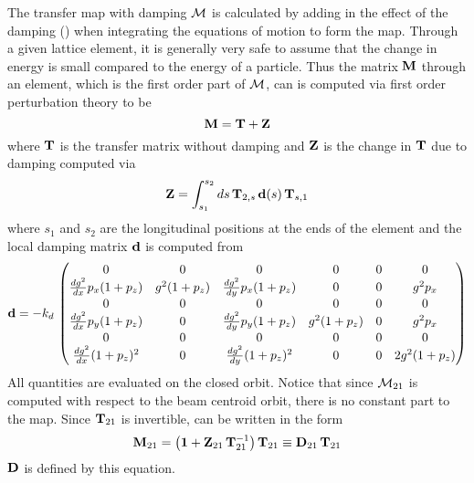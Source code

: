 The transfer map with damping ${\cal M}$ is calculated by adding in the effect of the damping
() when integrating the equations of motion to form the map. Through a given lattice
element, it is generally very safe to assume that the change in energy is small compared to the
energy of a particle. Thus the matrix ${\bf M}$ through an element, which is the first order part of
${\cal M}$, can is computed via first order perturbation theory to be
\begin{equation}
  {\bf M} = {\bf T} + {\bf Z}
  \label{mtz}
\end{equation}
where ${\bf T}$ is the transfer matrix without damping and ${\bf Z}$ is the change in ${\bf T}$ due
to damping computed via
\begin{equation}
  {\bf Z} = \int_{s_1}^{s_2} ds \, {\bf T}_{2,s} \, {\bf d}(s) \, {\bf T}_{s,1}
  \label{zstd}
\end{equation}
where $s_1$ and $s_2$ are the longitudinal positions at the ends of the element and
the local damping matrix ${\bf d}$ is computed from 
\begin{equation}
  {\bf d} = -k_d \, \begin{pmatrix}
    0                           & 0           & 0                           & 0           & 0 & 0       \\
    \frac{dg^2}{dx} p_x (1+p_z) & g^2 (1+p_z) & \frac{dg^2}{dy} p_x (1+p_z) & 0           & 0 & g^2 p_x \\
    0                           & 0           & 0                           & 0           & 0 & 0       \\
    \frac{dg^2}{dx} p_y (1+p_z) & 0           & \frac{dg^2}{dy} p_y (1+p_z) & g^2 (1+p_z) & 0 & g^2 p_x \\
    0                           & 0           & 0                           & 0           & 0 & 0       \\
    \frac{dg^2}{dx} (1+p_z)^2   & 0           & \frac{dg^2}{dy} (1+p_z)^2   & 0           & 0 & 2 g^2 (1+p_z) \\
  \end{pmatrix}
\end{equation}
All quantities are evaluated on the closed orbit. Notice that since ${\cal M}_{21}$ is computed with
respect to the beam centroid orbit, there is no constant part to the map. Since ${\bf T}_{21}$ is
invertible,  can be written in the form
\begin{equation}
  {\bf M}_{21} = \bigl( \boldsymbol{1} + {\bf Z}_{21} \, {\bf T}_{21}^{-1} \bigr) \, {\bf T}_{21} 
  \equiv {\bf D}_{21} \, {\bf T}_{21} 
\end{equation}
${\bf D}$ is defined by this equation.

